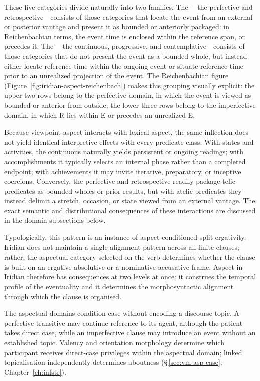 These five categories divide naturally into two families. The
---the perfective and retrospective---consists of those
categories that locate the event from an external or posterior vantage and
present it as bounded or anteriorly packaged: in Reichenbachian terms, the
event time is enclosed within the reference span, or precedes it. The
---the continuous, progressive, and
contemplative---consists of those categories that do not present the event as a
bounded whole, but instead either locate reference time within the ongoing event
or situate reference time prior to an unrealized projection of the event. The
Reichenbachian figure (Figure~\ref{fig:iridian-aspect-reichenbach}) makes this
grouping visually explicit: the upper two rows belong to the perfective domain,
in which the event is viewed as bounded or anterior from outside; the lower
three rows belong to the imperfective domain, in which R lies within E or
precedes an unrealized E.

Because viewpoint aspect interacts with lexical aspect, the same inflection does
not yield identical interpretive effects with every predicate class. With states
and activities, the continuous naturally yields persistent or ongoing readings;
with accomplishments it typically selects an internal phase rather than a
completed endpoint; with achievements it may invite iterative, preparatory, or
inceptive coercions. Conversely, the perfective and retrospective readily
package telic predicates as bounded wholes or prior results, but with atelic
predicates they instead delimit a stretch, occasion, or state viewed from an
external vantage. The exact semantic and distributional consequences of these
interactions are discussed in the domain subsections below.

Typologically, this pattern is an instance of aspect-conditioned split
ergativity. Iridian does not maintain a single alignment pattern across all
finite clauses; rather, the aspectual category selected on the verb determines
whether the clause is built on an ergative-absolutive or a nominative-accusative
frame. Aspect in Iridian therefore has consequences at two levels at once: it
construes the temporal profile of the eventuality and it determines the
morphosyntactic alignment through which the clause is organised.

The aspectual domains condition case without encoding a discourse topic.
A perfective transitive may continue reference to its agent, although the
patient takes direct case, while an imperfective clause may introduce an event
without an established topic. Valency and orientation morphology determine
which participant receives direct-case privileges within the aspectual domain;
linked topicalisation independently determines aboutness
(§\,\ref{sec:vm-asp-case}; Chapter~\ref{ch:infstr}).

